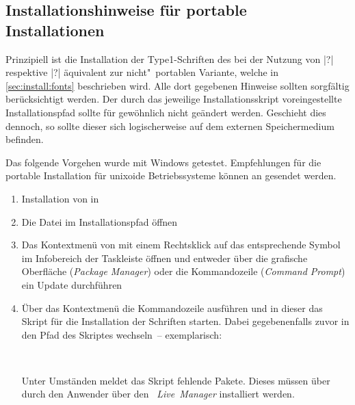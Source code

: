 \subsection{Installationshinweise für portable Installationen}
%
%
Prinzipiell ist die Installation der Type1-Schriften des \CDs bei der Nutzung 
von |?| respektive 
|?| äquivalent zur nicht"~portablen 
Variante, welche in \autoref{sec:install:fonts} beschrieben wird. Alle dort 
gegebenen Hinweise sollten sorgfältig berücksichtigt werden. Der durch das 
jeweilige Installationsskript voreingestellte Installationspfad sollte für 
gewöhnlich nicht geändert werden. Geschieht dies dennoch, so sollte dieser sich 
logischerweise auf dem externen Speichermedium   
 befinden.

Das folgende Vorgehen wurde mit Windows getestet. Empfehlungen für die portable 
Installation für unixoide Betriebssysteme können an \mailto{\TUDScriptContact} 
gesendet werden.
\begin{enumerate}
\item Installation von  in 
\item Die Datei  im Installationspfad öffnen
\item Das Kontextmenü von  mit einem 
  Rechtsklick auf das entsprechende Symbol im Infobereich der Taskleiste    
  öffnen und entweder über die grafische Oberfläche (\emph{Package Manager}) 
  oder die Kommandozeile (\emph{Command Prompt}) ein Update durchführen
\item Über das Kontextmenü die Kommandozeile ausführen und in dieser das Skript 
  für die Installation der Schriften  starten. 
  Dabei gegebenenfalls zuvor in den Pfad des Skriptes wechseln~-- exemplarisch:
  \begin{quoting}[leftmargin=1.5em,rightmargin=0pt]
  \newline%
  \,
  \end{quoting}
  Unter Umständen meldet das Skript fehlende Pakete. Dieses müssen über durch 
  den Anwender über den \emph{~Live~Manager} installiert werden.
\end{enumerate}

